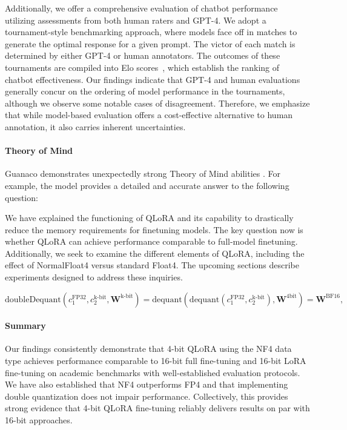 Additionally, we offer a comprehensive evaluation of chatbot performance utilizing assessments from both human raters and GPT-4. We adopt a tournament-style benchmarking approach, where models face off in matches to generate the optimal response for a given prompt. The victor of each match is determined by either GPT-4 or human annotators. The outcomes of these tournaments are compiled into Elo scores~\citep{elo1967proposed, elo1978rating}, which establish the ranking of chatbot effectiveness. Our findings indicate that GPT-4 and human evaluations generally concur on the ordering of model performance in the tournaments, although we observe some notable cases of disagreement. Therefore, we emphasize that while model-based evaluation offers a cost-effective alternative to human annotation, it also carries inherent uncertainties.

\paragraph{Theory of Mind} {Guanaco} demonstrates unexpectedly strong Theory of Mind abilities \cite{nematzadeh2018evaluating, sap2022neural}. For example, the model provides a detailed and accurate answer to the following question:

We have explained the functioning of QLoRA and its capability to drastically reduce the memory requirements for finetuning models. The key question now is whether QLoRA can achieve performance comparable to full-model finetuning. Additionally, we seek to examine the different elements of QLoRA, including the effect of NormalFloat4 versus standard Float4. The upcoming sections describe experiments designed to address these inquiries.

\begin{equation}
    \text{doubleDequant}(c_1^{\text{FP32}}, c_2^{\text{k-bit}}, \mathbf{W}^{\text{k-bit}}) = \text{dequant}(\text{dequant}(c_1^{\text{FP32}}, c_2^{\text{k-bit}}), \mathbf{W}^{\text{4bit}}) = \mathbf{W}^{\text{BF16}},
\end{equation}

\paragraph{Summary} Our findings consistently demonstrate that 4-bit \textsc{QLoRA} using the NF4 data type achieves performance comparable to 16-bit full fine-tuning and 16-bit LoRA fine-tuning on academic benchmarks with well-established evaluation protocols. We have also established that NF4 outperforms FP4 and that implementing double quantization does not impair performance. Collectively, this provides strong evidence that 4-bit \textsc{QLoRA} fine-tuning reliably delivers results on par with 16-bit approaches.

